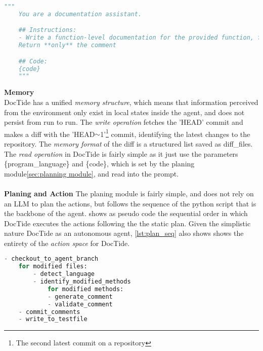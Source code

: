 \begin{lstlisting}[language=Python, label={lst:prompt}, caption=Prompt used for the LLM]
    """
    You are a documentation assistant.

    ## Instructions:
    - Write a function-level documentation for the provided function, following best documentation practice for {program_language}
    Return **only** the comment

    ## Code:
    {code}
    """
\end{lstlisting}
\textbf{Memory}
\\
DocTide has a unified \textit{memory structure}, which means that information perceived from the environment only exist in local states inside the agent, and does not persist from run to run. The \textit{write operation} fetches the 'HEAD' commit and makes a diff with the 'HEAD\(\sim \)1'\footnote{The second latest commit on a repository} commit, identifying the latest changes to the repository. The \textit{memory format} of the diff is a structured list saved as diff\_files. The \textit{read operation} in DocTide is fairly simple as it just use the parameters \{program\_language\} and \{code\}, which is set by the planing module\ref{sec:planning module}, and read into the prompt.
\\ \\
\textbf{Planing and Action}
\label{sec:planning module}
The planing module is fairly simple, and does not rely on an LLM to plan the actions, but follows the sequence of the python script that is the backbone of the agent.  shows as pseudo code the sequential order in which DocTide executes the actions following the the static plan. Given the simplistic nature DocTide as an autonomous agent, \ref{lst:plan_seq} also shows shows the entirety of the \textit{action space} for DocTide.

\begin{lstlisting}[language=Python, label={lst:plan_seq}, caption=The plan sequence of DocTides actions]
    - checkout_to_agent_branch
    for modified files:
        - detect_language
        - identify_modified_methods
            for modified methods:
            - generate_comment
            - validate_comment
    - commit_comments
    - write_to_testfile
\end{lstlisting}

